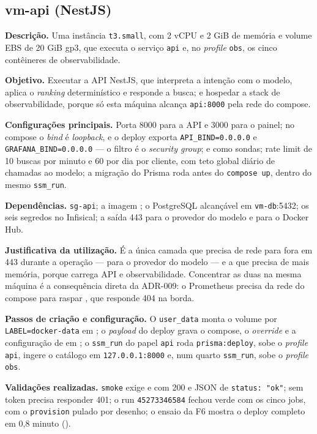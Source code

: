 \documentclass[11pt,a4paper]{article}
\begin{document}
\subsection{vm-api (NestJS)}

\textbf{Descrição.} Uma instância \texttt{t3.small}, com 2 vCPU e 2 GiB de memória e volume EBS de
20 GiB gp3, que executa o serviço \texttt{api} e, no \emph{profile} \texttt{obs}, os cinco
contêineres de observabilidade.

\textbf{Objetivo.} Executar a API NestJS, que interpreta a intenção com o modelo, aplica o
\emph{ranking} determinístico e responde a busca; e hospedar a stack de observabilidade, porque só
esta máquina alcança \texttt{api:8000} pela rede do compose.

\textbf{Configurações principais.} Porta 8000 para a API e 3000 para o painel; no compose o
\emph{bind} é \emph{loopback}, e o deploy exporta \texttt{API\_BIND=0.0.0.0} e
\texttt{GRAFANA\_\allowbreak{}BIND=0.0.0.0} --- o filtro é o \emph{security group};  e
 como sondas; rate limit de 10
buscas por minuto e 60 por dia por cliente, com teto global diário de chamadas ao modelo; a
migração do Prisma roda antes do \texttt{compose up}, dentro do mesmo \texttt{ssm\_run}.

\textbf{Dependências.} \texttt{sg-api}; a imagem ; o PostgreSQL
alcançável em \texttt{vm-db}:5432; os seis segredos no Infisical; a saída 443 para o provedor do
modelo e para o Docker Hub.

\textbf{Justificativa da utilização.} É a única camada que precisa de rede para fora em 443 durante
a operação --- para o provedor do modelo --- e a que precisa de mais memória, porque carrega API e
observabilidade. Concentrar as duas na mesma máquina é a consequência direta da ADR-009: o
Prometheus precisa da rede do compose para raspar , que responde 404 na borda.

\textbf{Passos de criação e configuração.} O \texttt{user\_data} monta o volume por
\texttt{LABEL=docker-data} em ; o \emph{payload} do deploy grava o compose,
o \emph{override} e a configuração de  em ; o
\texttt{ssm\_run} do papel \texttt{api} roda \texttt{prisma:deploy}, sobe o \emph{profile}
\texttt{api}, ingere o catálogo em \texttt{127.0.0.1:8000} e, num quarto \texttt{ssm\_run}, sobe o
\emph{profile} \texttt{obs}.

\textbf{Validações realizadas.} \texttt{smoke} exige  e  com 200 e
JSON de \texttt{status: "ok"};  sem token precisa responder 401; o
run \texttt{45273346584} fechou verde com os cinco jobs, com o \texttt{provision} pulado por
desenho; o ensaio da F6 mostra o deploy completo em
0,8 minuto ().
\end{document}
